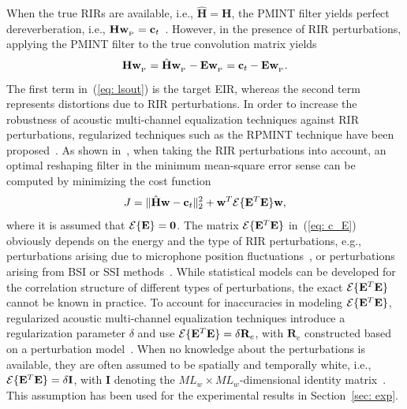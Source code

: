 \documentclass[10pt]{IEEEtran}
\begin{document}
When the true RIRs are available, i.e., $\hat{\mathbf{H}} = \mathbf{H}$, the PMINT filter yields perfect dereverberation, i.e., $\mathbf{H} \mathbf{w}_{_{\rm P}} = \mathbf{c}_t$~\cite{Kodrasi_ITASLP_2013}.
However, in the presence of RIR perturbations, applying the PMINT filter to the true convolution matrix yields
\begin{equation}
\label{eq: lsout}
\mathbf{H}\mathbf{w}_{_{\rm P}} = \hat{\mathbf{H}} \mathbf{w}_{_{\rm P}} - \mathbf{E}\mathbf{w}_{_{\rm P}} = \mathbf{c}_t - \mathbf{E}\mathbf{w}_{_{\rm P}}.
\end{equation}
The first term in~(\ref{eq: lsout}) is the target EIR, whereas the second term represents distortions due to RIR perturbations.
In order to increase the robustness of acoustic multi-channel equalization techniques against RIR perturbations, regularized techniques such as the RPMINT technique have been proposed~\cite{Kodrasi_ITASLP_2013}.
As shown in~\cite{Hikichi_EURASIP_2007}, when taking the RIR perturbations into account, an optimal reshaping filter in the minimum mean-square error sense can be computed by minimizing the cost function
\begin{equation}
\label{eq: c_E}
J = \| \hat{\mathbf{H}}\mathbf{w} - \mathbf{c}_t\|_2^2 + \mathbf{w}^T {\cal{E}}\{\mathbf{E}^T\mathbf{E} \}\mathbf{w},
\end{equation}
where it is assumed that ${\cal{E}}\{\mathbf{E} \} = \mathbf{0}$.
The matrix ${\cal{E}}\{\mathbf{E}^T\mathbf{E} \}$ in~(\ref{eq: c_E}) obviously depends on the energy and the type of RIR perturbations, e.g., perturbations arising due to microphone position fluctuations~\cite{Radlovic_ITSA_2000,Jungmann_ITASLP_2012}, or perturbations arising from BSI or SSI methods~\cite{Haque_SPL_2008,Lin_ITASLP_2012,Lim_IWAENC_2014}.
While statistical models can be developed for the correlation structure of different types of perturbations, the exact ${\cal{E}}\{\mathbf{E}^T \mathbf{E} \}$ cannot be known in practice. 
To account for inaccuracies in modeling ${\cal{E}}\{\mathbf{E}^T\mathbf{E} \}$, regularized acoustic multi-channel equalization techniques introduce a regularization parameter $\delta$ and use ${\cal{E}}\{ \mathbf{E}^T \mathbf{E} \} = \delta \mathbf{R}_{e}$, with $\mathbf{R}_{e}$ constructed based on a perturbation model~\cite{Jungmann_ITASLP_2012, Lim_IWAENC_2014}. 
{{When no knowledge about the perturbations is available, they are often assumed to be spatially and temporally white, i.e., ${\cal{E}}\{\mathbf{E}^T \mathbf{E} \} = \delta \mathbf{I}$, with $\mathbf{I}$ denoting the $ML_w \times ML_w$-dimensional identity matrix~\cite{Hikichi_EURASIP_2007,Kodrasi_ITASLP_2013}.
This assumption has been used for the experimental results in Section~\ref{sec: exp}.}}
\end{document}
